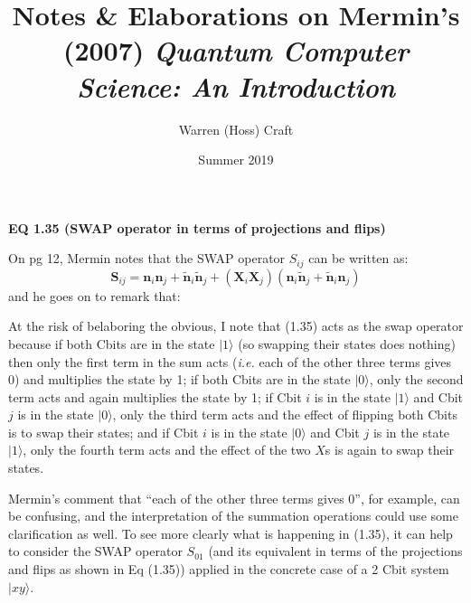\documentclass{article}
\title{Notes \& Elaborations on Mermin's (2007) \textit{Quantum Computer Science: An Introduction}}
\author{Warren (Hoss) Craft}
\date{Summer 2019}
\begin{document}
\maketitle

\flushleft


\textbf{EQ 1.35 (SWAP operator in terms of projections and flips)}\par

\vspace{0.125in}

On pg 12, Mermin \cite{Mermin:2007} notes that the SWAP operator $S_{ij}$ can be written as:
\[\tag{1.35}
    \bm{S}_{ij} = \bm{n}_i \bm{n}_j
    + \bm{\widetilde{n}}_i \bm{\widetilde{n}}_j
    + (\bm{X}_i \bm{X}_j)
      ( \bm{n}_i \bm{\widetilde{n}}_j 
        + \bm{\widetilde{n}}_i \bm{n}_j)
\]
and he goes on to remark that:
\vspace{0.125in}
\begin{addmargin}[0.25in]{0.25in}
At the risk of belaboring the obvious, I note that (1.35) acts as the swap operator because if both Cbits are in the state $|1\rangle$ (so swapping their states does nothing) then only the first term in the sum acts (\textit{i.e.} each of the other three terms gives 0) and multiplies the state by 1; if both Cbits are in the state $|0\rangle$, only the second term acts and again multiplies the state by 1; if Cbit $i$ is in the state $|1\rangle$ and Cbit $j$ is in the state $|0\rangle$, only the third term acts and the effect of flipping both Cbits is to swap their states; and if Cbit $i$ is in the state $|0\rangle$ and Cbit $j$ is in the state $|1\rangle$, only the fourth term acts and the effect of the two $X$s is again to swap their states.
\end{addmargin}

\vspace{0.125in}

Mermin's comment that ``each of the other three terms gives 0'', for example, can be confusing, and the interpretation of the summation operations could use some clarification as well. To see more clearly what is happening in (1.35), it can help to consider the SWAP operator $S_{01}$ (and its equivalent in terms of the projections and flips as shown in Eq (1.35)) applied in the concrete case of a 2 Cbit system $|xy\rangle$.

\vspace{0.125in}
\end{document}
